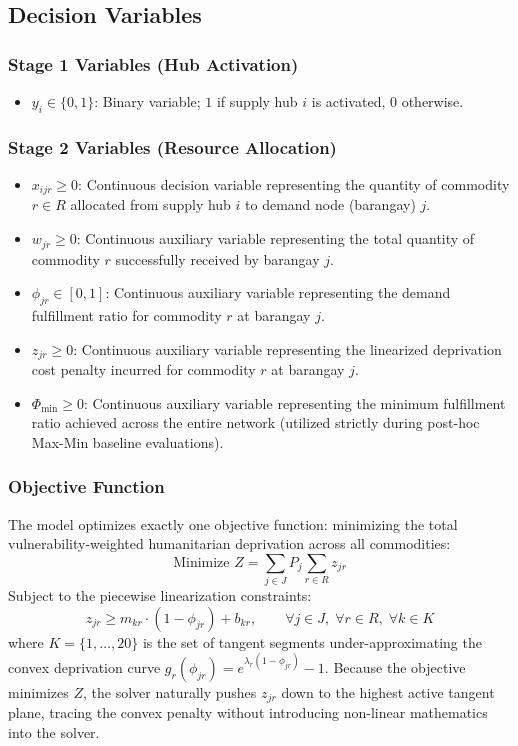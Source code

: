 \subsection{Decision Variables}
\subsubsection{Stage 1 Variables (Hub Activation)}
\begin{itemize}
    \item $y_i \in \{0,1\}$: Binary variable; $1$ if supply hub $i$ is activated, $0$ otherwise.
\end{itemize}

\subsubsection{Stage 2 Variables (Resource Allocation)}
\begin{itemize}
    \item $x_{ijr} \ge 0$: Continuous decision variable representing the quantity of commodity $r \in R$ allocated from supply hub $i$ to demand node (barangay) $j$.
    \item $w_{jr} \ge 0$: Continuous auxiliary variable representing the total quantity of commodity $r$ successfully received by barangay $j$.
    \item $\phi_{jr} \in [0, 1]$: Continuous auxiliary variable representing the demand fulfillment ratio for commodity $r$ at barangay $j$.
    \item $z_{jr} \ge 0$: Continuous auxiliary variable representing the linearized deprivation cost penalty incurred for commodity $r$ at barangay $j$.
    \item $\Phi_{\min} \ge 0$: Continuous auxiliary variable representing the minimum fulfillment ratio achieved across the entire network (utilized strictly during post-hoc Max-Min baseline evaluations).
\end{itemize}

\subsubsection{Objective Function}
The model optimizes exactly one objective function: minimizing the total vulnerability-weighted humanitarian deprivation across all commodities:
\begin{equation}
    \text{Minimize } Z = \sum_{j \in J} P_j \sum_{r \in R} z_{jr}
    \label{eq:objective}
\end{equation}
Subject to the piecewise linearization constraints:
\begin{equation}
    z_{jr} \ge m_{kr} \cdot (1 - \phi_{jr}) + b_{kr}, \qquad \forall j \in J, \; \forall r \in R, \; \forall k \in K
    \label{eq:piecewise_linearization}
\end{equation}
where $K = \{1, \dots, 20\}$ is the set of tangent segments under-approximating the convex deprivation curve $g_r(\phi_{jr}) = e^{\lambda_r(1-\phi_{jr})} - 1$. Because the objective minimizes $Z$, the solver naturally pushes $z_{jr}$ down to the highest active tangent plane, tracing the convex penalty without introducing non-linear mathematics into the solver.

